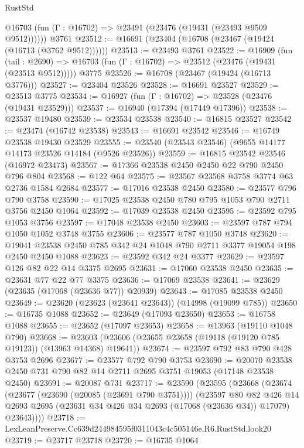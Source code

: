 \begin{lexlean}{RustStd}
\begin{coremodule}
      @16703 (fun (Γ : @16702) => @23491 (@23476 (@19431 (@23493 @9509 @9512))))))
    @3761
@23512 := @16691 (@23404 (@16708 (@23467 (@19424 (@16713 (@3762 @9512))))))
@23513 := @23493 @3761
@23522 := @16909
    (fun (tail : @2690) => @16703 (fun (Γ : @16702) => @23512 (@23476 (@19431 (@23513 @9512)))))
    @3775
@23526 := @16708 (@23467 (@19424 (@16713 @3776)))
@23527 := @23404 @23526
@23528 := @16691 @23527
@23529 := @23513 @3775
@23534 := @16927 (fun (Γ : @16702) => @23528 (@23476 (@19431 @23529)))
@23537 := @16940 (@17394 (@17449 @17396))
@23538 := @23537 @19480
@23539 := @23534 @23538
@23540 := @16815 @23527
@23542 := @23474 (@16742 @23538)
@23543 := @16691 @23542
@23546 := @16749 @23538 @19430 @23529
@23555 := @23540 (@23543 @23546) (@9655 @14177 @14173 @23526 @14184 (@9526 @23526))
@23559 := @16815 @23542 @23546 (@16972 @23473)
@23567 := @17366 @23538 @2450 @2450 @22 @790 @2450 @796 @804
@23568 := @122 @64
@23575 := @23567 @23568 @3758 @3774 @63 @2736 @1584 @2684
@23577 := @17016 @23538 @2450
@23580 := @23577 @796 @790 @3758
@23590 := @17025 @23538 @2450 @780 @795 @1053 @790 @2711 @3756 @2450 @1064
@23592 := @17039 @23538 @2450
@23595 := @23592 @795 @1053 @3756
@23597 := @17048 @23538 @2450
@23603 := @23597 @787 @794 @1050 @1052 @3748 @3755
@23606 := @23577 @787 @1050 @3748
@23620 := @19041 @23538 @2450 @785 @342 @24 @1048 @790 @2711 @3377 @19054 @198 @2450 @2450 @1088
@23623 := @23592 @342 @24 @3377
@23629 := @23597 @126 @82 @22 @14 @3375 @2695
@23631 := @17060 @23538 @2450
@23635 := @23631 @77 @22 @77 @3375
@23636 := @17069 @23538
@23641 := @23629 (@23635 (@17068 (@23636 @77)) @20939)
@23643 := @17085 @23538 @2450
@23649 := @23620 (@23623 (@23641 @23643)) (@14998 (@19099 @785))
@23650 := @16735 @1088
@23652 := @23649 (@17093 @23650)
@23653 := @16758 @1088
@23655 := @23652 (@17097 @23653)
@23658 := @13963 (@19110 @1048 @790)
@23668 := @23603 (@23606 (@23655 @23658 (@19118 (@19120 @785 @19123)) (@13963 @14368) @19641))
@23674 := @23597 @792 @83 @790 @428 @3753 @2696
@23677 := @23577 @792 @790 @3753
@23690 := @20070 @23538 @2450 @731 @790 @82 @14 @2711 @2695 @3751 @19053 (@17148 @23538 @2450)
@23691 := @20087 @731
@23717 := @23590
    (@23595
      (@23668
        (@23674
          (@23677 (@23690 (@20085 (@23691 @790 @3751))))
          (@23597
            @80
            @82
            @426
            @14
            @2693
            @2695
            (@23631 @34 @426 @34 @2693 (@17068 (@23636 @34)) @17079)
            @23643))))
@23718 := LexLeanPreserve.Cc639d244984595f0311043c4c505146e.R6.RustStd.look20
@23719 := @23717 @23718
@23720 := @16735 @1064

\end{coremodule}
\end{lexlean}
